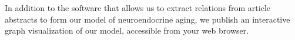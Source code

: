 In addition to the software that allows us to extract relations from article abstracts
to form our model of neuroendocrine aging, we publish an interactive graph visualization
of our model, accessible from your web browser.
